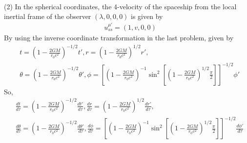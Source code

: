 \documentclass[12pt]{article}
\begin{document}
\begin{comment}
\begin{align*}
ds^2 &= -c^2 \left(1 - \frac{2 G M}{r_0 c^2} \right) dt'^2 + \left(1 - \frac{2 G M}{r_0 c^2} \right)^{-1} dx^2 + dy^2 + dz^2
\end{align*}
For the metric to be Minkowski, we can define the coordinate transformation
\begin{align*}
t'' = \left(1 - \frac{2 G M}{r_0 c^2} \right)^{1/2} \, t', \quad x' = \left(1 - \frac{2 G M}{r_0 c^2} \right)^{-1/2} x, \quad y' = y, \quad z' = z
\end{align*}
since this will give the line element
\begin{align*}
ds^2 &= -c^2 dt''^2 +  dx'^2 + dy'^2 + dz'^2
\end{align*}
Thus, we can construct the target transformations the composite transformation of the cylindrical transformation and the transformation above, given by
\begin{gather*}
t' = \left(1 - \frac{2 G M}{r_0 c^2} \right)^{1/2} t, \quad x = \left(1 - \frac{2 G M}{r_0 c^2} \right)^{-1/2} r \sin{\theta} \cos{\phi}, \quad y = r \sin{\theta} \sin{\phi}, \quad z = r \cos{\theta}
\end{gather*}
{\color{red}Still, this transformation is in the Cartesian coordinates. If we transform this in the cylindrical coordinates,}\\
\end{comment}
(2)
In the spherical coordinates, the 4-velocity of the spaceship from the local inertial frame of the observer $\left(\lambda, 0, 0, 0\right)$ is given by
\begin{gather*}
\quad u_{ss}^{\mu'} = \left(1, v, 0, 0\right)
\end{gather*}
By using the inverse coordinate transformation in the last problem, given by
\begin{align*}
&t =  \left(1 - \frac{2 G M}{r_0 c^2} \right)^{- 1/2} t', r =  \left(1 - \frac{2 G M}{r_0 c^2} \right)^{1/2} r',\\[1em]
&\theta =  \left(1 - \frac{2 G M}{r_0 c^2} \right)^{- 1/2} \theta', \phi = \left[\left(1 - \frac{2 G M}{r_0 c^2} \right)^{-1} \sin^2\left[\left(1 - \frac{2 G M}{r_0 c^2} \right)^{1/2} \frac{\pi}{2} \right]\right]^{- 1/2} \phi'
\end{align*}
So,
\begin{align*}
&\frac{d t}{d \tau} =  \left(1 - \frac{2 G M}{r_0 c^2} \right)^{-1/2} \frac{d t'}{d \tau}, \frac{d r}{d \tau} =  \left(1 - \frac{2 G M}{r_0 c^2} \right)^{1/2} \frac{d r'}{d \tau},\\[1em] 
&\frac{d \theta}{d \tau} = \left(1 - \frac{2 G M}{r_0 c^2} \right)^{-1/2} \frac{d \theta'}{d \tau}, \frac{d \phi}{d \tau} = \left[\left(1 - \frac{2 G M}{r_0 c^2} \right)^{-1} \sin^2\left[\left(1 - \frac{2 G M}{r_0 c^2} \right)^{1/2} \frac{\pi}{2} \right]\right]^{-1/2} \frac{d \phi'}{d \tau}
\end{align*}
\end{document}

